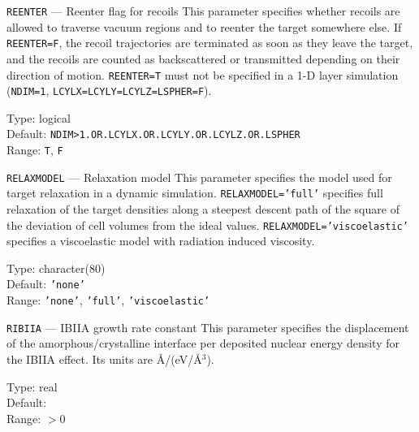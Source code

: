 \begin{keydescription}{\texttt{REENTER} --- Reenter flag for recoils}
%
  This parameter specifies whether recoils are allowed to traverse 
  vacuum regions and to reenter the target somewhere else. If
  \texttt{REENTER=F}, the recoil trajectories are terminated as soon
  as they leave the target, and the recoils are counted as backscattered or
  transmitted depending on their direction of motion. \texttt{REENTER=T} 
  must not be specified in a 1-D layer simulation (\texttt{NDIM=1},
  \texttt{LCYLX=LCYLY=LCYLZ=LSPHER=F}).
  \begin{keytab}
    Type:    \> logical \\
    Default: \> \texttt{NDIM>1.OR.LCYLX.OR.LCYLY.OR.LCYLZ.OR.LSPHER} \\
    Range:   \> \texttt{T}, \texttt{F}
  \end{keytab}
\end{keydescription}

\ifprivate
\begin{keydescription}{\texttt{RELAXMODEL} --- Relaxation model}
%
  This parameter specifies the model used for target relaxation in a
  dynamic simulation. \texttt{RELAXMODEL='full'} specifies full relaxation
  of the target densities along a steepest descent path of the square of the 
  deviation of cell volumes from the ideal values. 
  \texttt{RELAXMODEL='viscoelastic'} specifies a viscoelastic model with
  radiation induced viscosity.
  \begin{keytab}
    Type:    \> character(80) \\
    Default: \> \texttt{'none'} \\
    Range:   \> \texttt{'none'}, \texttt{'full'}, \texttt{'viscoelastic'}
  \end{keytab}
\end{keydescription}
\fi

\begin{keydescription}{\texttt{RIBIIA} --- IBIIA growth rate constant}
%
  This parameter specifies the displacement of the
  amorphous/crystalline interface per deposited nuclear energy
  density for the IBIIA effect. Its units are \AA /(eV/\AA $^3$).
  \begin{keytab}
    Type:    \> real \\
    Default:  \\
    Range:   \> $> 0$ 
  \end{keytab}
\end{keydescription}

